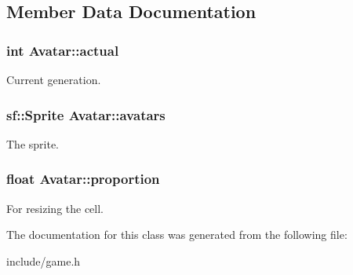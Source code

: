 \subsection{Member Data Documentation}
\subsubsection[{actual}]{\setlength{\rightskip}{0pt plus 5cm}int Avatar\+::actual\hspace{0.3cm}{\ttfamily [private]}}\hypertarget{classAvatar_aae21cdaf10a7378c2dc001cea97d832e}{}\label{classAvatar_aae21cdaf10a7378c2dc001cea97d832e}
Current generation. 
\subsubsection[{avatars}]{\setlength{\rightskip}{0pt plus 5cm}sf\+::\+Sprite Avatar\+::avatars\hspace{0.3cm}{\ttfamily [private]}}\hypertarget{classAvatar_acad0823a51d4780f9a43e8daf6ff84bc}{}\label{classAvatar_acad0823a51d4780f9a43e8daf6ff84bc}
The sprite. 
\subsubsection[{proportion}]{\setlength{\rightskip}{0pt plus 5cm}float Avatar\+::proportion\hspace{0.3cm}{\ttfamily [private]}}\hypertarget{classAvatar_aa92a76326cfa48f098526ddba0d674f2}{}\label{classAvatar_aa92a76326cfa48f098526ddba0d674f2}
For resizing the cell. 

The documentation for this class was generated from the following file\+:\begin{DoxyCompactItemize}
\item 
include/game.\+h\end{DoxyCompactItemize}
